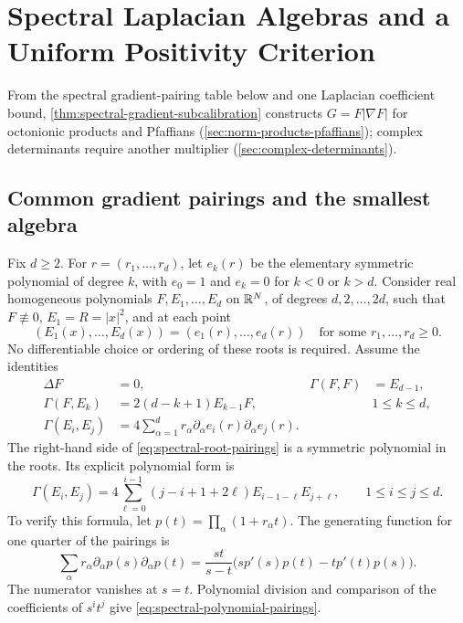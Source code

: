 \section[Spectral Algebras and Positivity]{Spectral Laplacian Algebras and a Uniform Positivity Criterion}
\label{sec:spectral-positivity}

From the spectral gradient-pairing table below and one Laplacian
coefficient bound, \cref{thm:spectral-gradient-subcalibration} constructs
\(G=F|\nabla F|\) for octonionic products and Pfaffians
(\cref{sec:norm-products-pfaffians}); complex determinants require
another multiplier (\cref{sec:complex-determinants}).

\subsection{Common gradient pairings and the smallest algebra}

Fix \(d\ge2\).  For \(r=(r_1,\ldots,r_d)\), let \(e_k(r)\)
be the elementary symmetric polynomial of degree \(k\), with
\(e_0=1\) and \(e_k=0\) for \(k<0\) or \(k>d\).
Consider real homogeneous polynomials \(F,E_1,\ldots,E_d\) on
\(\mathbb R^N\), of degrees \(d,2,\ldots,2d\), such that
\(F\not\equiv0\), \(E_1=R=|x|^2\), and at each point
\begin{equation}\label{eq:spectral-nonnegative-roots}
 (E_1(x),\ldots,E_d(x))=(e_1(r),\ldots,e_d(r))
 \quad\text{for some }r_1,\ldots,r_d\ge0.
\end{equation}
No differentiable choice or ordering of these roots is required.
Assume the identities
\begin{align}
 \Delta F&=0,& \Gamma(F,F)&=E_{d-1},
 \label{eq:spectral-F-pairings}\\
 \Gamma(F,E_k)&=2(d-k+1)E_{k-1}F,
 &&1\le k\le d,
 \label{eq:spectral-mixed-pairings}\\
 \Gamma(E_i,E_j)&=
 4\sum_{\alpha=1}^d r_\alpha
           \partial_\alpha e_i(r)\partial_\alpha e_j(r).
 \label{eq:spectral-root-pairings}
\end{align}
The right-hand side of \eqref{eq:spectral-root-pairings} is a
symmetric polynomial in the roots.  Its explicit polynomial form is
\begin{equation}\label{eq:spectral-polynomial-pairings}
 \Gamma(E_i,E_j)=4\sum_{\ell=0}^{i-1}
 (j-i+1+2\ell)E_{i-1-\ell}E_{j+\ell},
 \qquad 1\le i\le j\le d.
\end{equation}
To verify this formula, let \(p(t)=\prod_\alpha(1+r_\alpha t)\).
The generating function for one quarter of the pairings is
\[
 \sum_\alpha r_\alpha
       \partial_\alpha p(s)\partial_\alpha p(t)
 =\frac{st}{s-t}
       \bigl(sp'(s)p(t)-tp'(t)p(s)\bigr).
\]
The numerator vanishes at \(s=t\).  Polynomial division and
comparison of the coefficients of \(s^it^j\) give
\eqref{eq:spectral-polynomial-pairings}.

